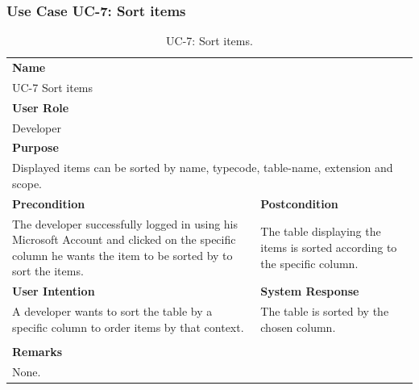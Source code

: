 
\subsubsection{Use Case UC-7: Sort items}\label{subsubsec:use-case-uc-7:-sort-items}

\begin{table}[H]
    \centering
    \begin{tabular}{|p{}|p{}|}

        \hline
        \multicolumn{2}{|l|}{\rowcolor{gray!50}\textbf{Name}} \\
        \multicolumn{2}{|l|}{UC-7 Sort items} \\ \hline

        \multicolumn{2}{|l|}{\rowcolor{gray!50}\textbf{User Role}} \\
        \multicolumn{2}{|l|}{Developer} \\ \hline

        \multicolumn{2}{|l|}{\rowcolor{gray!50}\textbf{Purpose}} \\
        \multicolumn{2}{|p{1\textwidth}|}{Displayed items can be sorted by name, typecode, table-name, extension and scope.} \\ \hline

        \rowcolor{gray!50}\textbf{Precondition} & \rowcolor{gray!50}\textbf{Postcondition} \\
        The developer successfully logged in using his Microsoft Account and clicked on the specific column he wants the item to be sorted by to sort the items.
        &
        The table displaying the items is sorted according to the specific column. \\ \hline

        \rowcolor{gray!50}\textbf{User Intention} & \rowcolor{gray!50}\textbf{System Response} \\
        A developer wants to sort the table by a specific column to order items by that context.
        &
        The table is sorted by the chosen column. \\ \hline

        & \\ \hline

        \multicolumn{2}{|l|}{\rowcolor{gray!50}\textbf{Remarks}} \\
        \multicolumn{2}{|p{1\textwidth}|}{None.} \\ \hline
    \end{tabular}
    \caption{UC-7: Sort items.}
    \label{tab:uc-sort-items}
\end{table}

